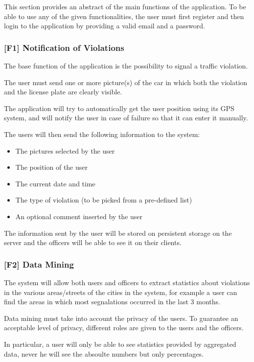 This section provides an abstract of the main functions of the application. To be able to use any of the given functionalities, the user must first register and then login to the application by providing a valid email and a password.
\subsubsection[]{[F1] Notification of Violations\hypertarget{sec:f1}{}}
\label{sec:f1}
The base function of the application is the possibility to signal a traffic violation.

The user must send one or more picture(s) of the car in which both the violation and the license plate are clearly visible.

The application will try to automatically get the user position using its GPS system, and will notify the user in case of failure so that it can enter it manually.

The users will then send the following information to the system:
\begin{itemize}
    \item The pictures selected by the user
    \item The position of the user
    \item The current date and time
    \item The type of violation (to be picked from a pre-defined list)
    \item An optional comment inserted by the user
\end{itemize}
The information sent by the user will be stored on persistent storage on the server and the officers will be able to see it on their clients.

\subsubsection[]{[F2] Data Mining\hypertarget{sec:f2}{}}
The system will allow both users and officers to extract statistics about violations in the various areas/streets of the cities in the system,
for example a user can find the areas in which most segnalations occurred in the last 3 months.

Data mining must take into account the privacy of the users.
To guarantee an acceptable level of privacy, different roles are given to the users and the officers.

In particular, a user will only be able to see statistics provided by aggregated data, never he will see the absoulte numbers but only percentages. 

